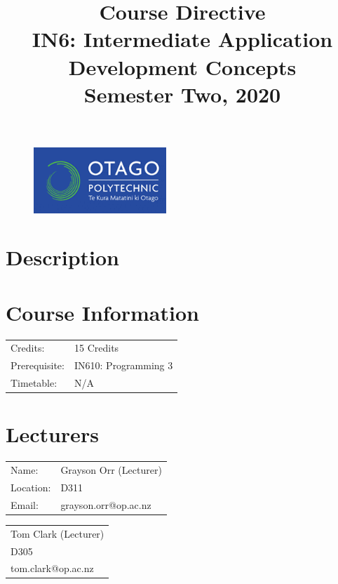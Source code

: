 \documentclass{article}
\author{}
\begin{document}
\begin{figure}
  \includegraphics[width=50mm]{../../resources/img/logo.png}
\end{figure}

\title{Course Directive\\IN6: Intermediate Application Development Concepts\\Semester Two, 2020}
\date{}
\maketitle

\section*{Description}

\section*{Course Information}
\begin{tabular}{ll}
  Credits:      & 15 Credits \\
  Prerequisite: & IN610: Programming 3           \\
  Timetable:    & N/A        \\
\end{tabular}

\section*{Lecturers}
\begin{tabular}{ll}
  Name:     & Grayson Orr (Lecturer) \\
  Location: & D311                   \\
  Email:    & grayson.orr@op.ac.nz   \\
\end{tabular}
\begin{tabular}{l}
	Tom Clark (Lecturer) \\
	D305                             \\
	tom.clark@op.ac.nz            \\
\end{tabular}
\end{document}
